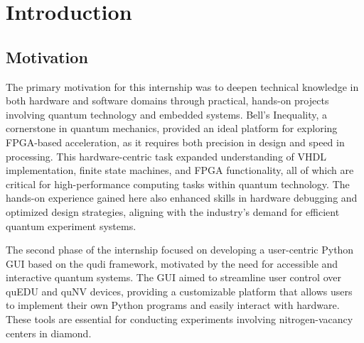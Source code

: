 \chapter{Introduction}
\label{ch:intro}


%
%
\section{Motivation}

The primary motivation for this internship was to deepen technical knowledge in both hardware and software domains through practical, hands-on projects involving quantum technology and embedded systems. Bell’s Inequality, a cornerstone in quantum mechanics, provided an ideal platform for exploring FPGA-based acceleration, as it requires both precision in design and speed in processing. This hardware-centric task expanded understanding of VHDL implementation, finite state machines, and \acs{FPGA} functionality, all of which are critical for high-performance computing tasks within quantum technology. The hands-on experience gained here also enhanced skills in hardware debugging and optimized design strategies, aligning with the industry's demand for efficient quantum experiment systems.

The second phase of the internship focused on developing a user-centric Python \acs{GUI} based on the qudi framework, motivated by the need for accessible and interactive quantum systems. The \acs{GUI} aimed to streamline user control over \acs{quEDU} and \acs{quNV} devices, providing a customizable platform that allows users to implement their own Python programs and easily interact with hardware. These tools are essential for conducting experiments involving nitrogen-vacancy centers in diamond.









